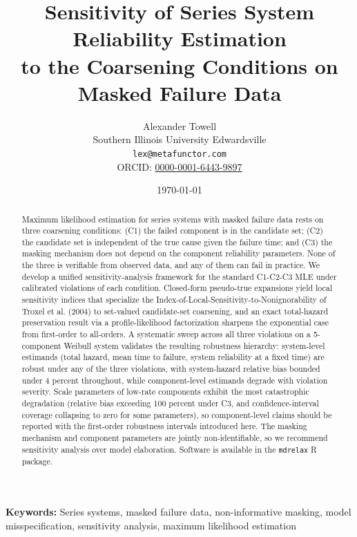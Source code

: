 \documentclass[11pt,letterpaper]{article}
\title{Sensitivity of Series System Reliability Estimation\\
to the Coarsening Conditions on Masked Failure Data}
\author{
    Alexander Towell\\
    Southern Illinois University Edwardsville\\
    \texttt{lex@metafunctor.com}\\
    ORCID: \href{https://orcid.org/0000-0001-6443-9897}{0000-0001-6443-9897}
}
\date{\today}
\theoremstyle{remark}
\begin{document}
\doublespacing

\maketitle

\begin{abstract}
Maximum likelihood estimation for series systems with masked failure data
rests on three coarsening conditions: (C1) the failed component is in the
candidate set; (C2) the candidate set is independent of the true cause
given the failure time; and (C3) the masking mechanism does not depend on
the component reliability parameters. None of the three is verifiable
from observed data, and any of them can fail in practice. We develop a
unified sensitivity-analysis framework for the standard C1-C2-C3 MLE
under calibrated violations of each condition. Closed-form pseudo-true
expansions yield local sensitivity indices that specialize the
Index-of-Local-Sensitivity-to-Nonignorability of Troxel et al. (2004) to
set-valued candidate-set coarsening, and an exact total-hazard
preservation result via a profile-likelihood factorization sharpens the
exponential case from first-order to all-orders. A systematic sweep
across all three violations on a 5-component Weibull system validates
the resulting robustness hierarchy: system-level estimands (total
hazard, mean time to failure, system reliability at a fixed time) are
robust under any of the three violations, with system-hazard relative
bias bounded under 4 percent throughout, while component-level estimands
degrade with violation severity. Scale parameters of low-rate components
exhibit the most catastrophic degradation (relative bias exceeding 100
percent under C3, and confidence-interval coverage collapsing to zero
for some parameters), so component-level claims should be reported with
the first-order robustness intervals introduced here. The masking
mechanism and component parameters are jointly non-identifiable, so we
recommend sensitivity analysis over model elaboration. Software is
available in the \texttt{mdrelax} R package.
\end{abstract}

\noindent\textbf{Keywords:}
Series systems, masked failure data, non-informative masking, model
misspecification, sensitivity analysis, maximum likelihood estimation

\end{document}
